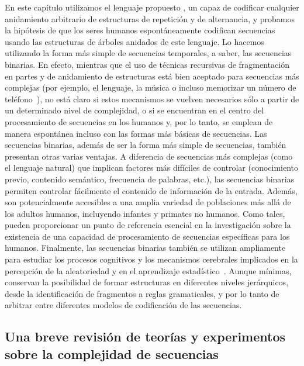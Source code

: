 En este capítulo utilizamos el lenguaje propuesto \grambin, un \lot capaz de codificar cualquier anidamiento arbitrario de estructuras de repetición y de alternancia, y probamos la hipótesis de que los seres humanos espontáneamente codifican secuencias usando las estructuras de árboles anidados de este lenguaje. Lo hacemos utilizando la forma más simple de secuencias temporales, a saber, las secuencias binarias. En efecto, mientras que el uso de técnicas recursivas de fragmentación en partes y de anidamiento de estructuras está bien aceptado para secuencias más complejas (por ejemplo, el lenguaje, la música o incluso memorizar un número de teléfono~\cite{f16}), no está claro si estos mecanismos se vuelven necesarios sólo a partir de un determinado nivel de complejidad, o si se encuentran en el centro del procesamiento de secuencias en los humanos y, por lo tanto, se emplean de manera espontánea incluso con las formas más básicas de secuencias. 
Las secuencias binarias, además de ser la forma más simple de secuencias, también presentan otras varias ventajas. A diferencia de secuencias más complejas (como el lenguaje natural) que implican factores más difíciles de controlar (conocimiento previo, contenido semántico, frecuencia de palabras, etc.), las secuencias binarias permiten controlar fácilmente el contenido de información de la entrada. Además, son potencialmente accesibles a una amplia variedad de poblaciones más allá de los adultos humanos, incluyendo infantes y primates no humanos. Como tales, pueden proporcionar un punto de referencia esencial en la investigación sobre la existencia de una capacidad de procesamiento de secuencias específicas para los humanos. Finalmente, las secuencias binarias también se utilizan ampliamente para estudiar los procesos cognitivos y los mecanismos cerebrales implicados en la percepción de la aleatoriedad y en el aprendizaje estadístico~\cite{f17,f18,f19,f20,f21,f22}. Aunque mínimas, conservan la posibilidad de formar estructuras en diferentes niveles jerárquicos, desde la identificación de fragmentos a reglas gramaticales, y por lo tanto de arbitrar entre diferentes modelos de codificación de las secuencias. 

\subsection{Una breve revisión de teorías y experimentos sobre la complejidad de secuencias}


